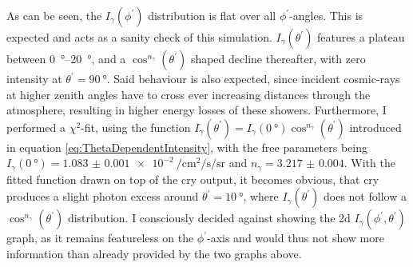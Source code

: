 As can be seen, the $I_\gamma(\phi^{\prime})$ distribution is flat over all $\phi^{\prime}$-angles. This is expected and acts as a sanity check of this simulation. $I_\gamma(\theta^{\prime})$ features a plateau between \SIrange{0}{20}{\degree}, and a $\cos^{n_\gamma}{(\theta^{\prime})}$ shaped decline thereafter, with zero intensity at $\theta^{\prime} = \SI{90}{\degree}$. Said behaviour is also expected, since incident cosmic-rays at higher zenith angles have to cross ever increasing distances through the atmosphere, resulting in higher energy losses of these showers. Furthermore, I performed a $\chi^2$-fit, using the function $I_\gamma(\theta^\prime) = I_\gamma(\SI{0}{\degree}) \cos^{n_{\gamma}}{(\theta^\prime)}$ introduced in equation \ref{eq:ThetaDependentIntensity}, with the free parameters being $I_\gamma(\SI{0}{\degree}) = \SI{1.083(1)e-2}{\per\centi\metre\squared\per\second\per\steradian}$ and $n_\gamma = \num{3.217(4)}$. With the fitted function drawn on top of the \gls{cry} output, it becomes obvious, that \gls{cry} produces a slight photon excess around $\theta^\prime = \SI{10}{\degree}$, where $I_\gamma(\theta^{\prime})$ does not follow a $\cos^{n_\gamma}{(\theta^{\prime})}$ distribution. I consciously decided against showing the \gls{2d} $I_\gamma(\phi^{\prime},\theta^{\prime})$ graph, as it remains featureless on the $\phi^{\prime}$-axis and would thus not show more information than already provided by the two graphs above.

